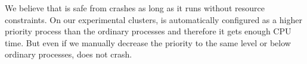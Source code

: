 We believe that  is safe from crashes as long as it runs without resource constraints. On our experimental clusters,  is automatically configured as a higher priority process than the ordinary processes and therefore it gets enough CPU time. But even if we manually decrease the priority to the same level or below ordinary processes,  does not crash.
